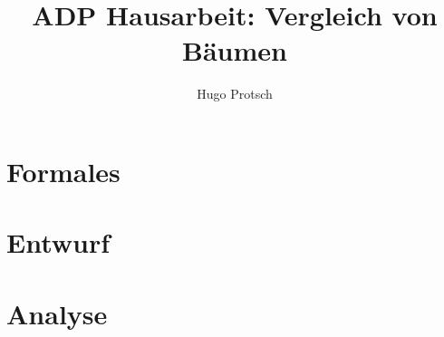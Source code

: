 \documentclass[11pt]{article}
\title{ADP Hausarbeit: Vergleich von Bäumen}
\author{Hugo Protsch}
\begin{document}
    \section{Formales}\label{sec:formales}


    \section{Entwurf}\label{sec:entwurf}
    


    \section{Analyse}\label{sec:analyse}
    
\end{document}
